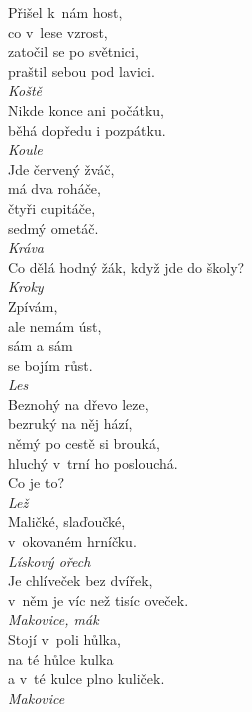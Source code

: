 \begin{multicols}{4}
\noindent
Přišel k~nám host,\\
co v~lese vzrost,\\
zatočil se po světnici,\\
praštil sebou pod lavici.\\[1 mm]
{\sl Koště}\\

\noindent
Nikde konce ani počátku,\\
běhá dopředu i pozpátku.\\[1 mm]
{\sl Koule}\\

\noindent
Jde červený žváč,\\
má dva roháče,\\
čtyři cupitáče,\\
sedmý ometáč.\\[1 mm]
{\sl Kráva}\\

\noindent
Co dělá hodný žák, když jde do školy?\\[1 mm]
{\sl Kroky}\\

\noindent
Zpívám,\\
ale nemám úst,\\
sám a sám\\
se bojím růst.\\[1 mm]
{\sl Les}\\

\noindent
Beznohý na dřevo leze,\\
bezruký na něj hází,\\
němý po cestě si brouká,\\
hluchý v~trní ho poslouchá.\\
Co je to?\\[1 mm]
{\sl Lež}\\

\noindent
Maličké, slaďoučké,\\
v~okovaném hrníčku.\\[1 mm]
{\sl Lískový ořech}\\

\noindent
Je chlíveček bez dvířek,\\
v~něm je víc než tisíc oveček.\\[1 mm]
{\sl Makovice, mák}\\

\noindent
Stojí v~poli hůlka,\\
na té hůlce kulka\\
a v~té kulce plno kuliček.\\[1 mm]
{\sl Makovice}\\


\end{multicols}
